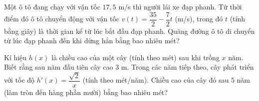 \begin{bt}%
	Một ô tô đang chạy với vận tốc $17{,}5$ m/s thì người lái xe đạp phanh. Từ thời điểm đó ô tô chuyển động với vận tốc $v(t)=\dfrac{35}{2}-\dfrac{7}{2} t$ (m/s), trong đó $t$ (tính bằng giây) là thời gian kể từ lúc bắt đầu đạp phanh. Quãng đường ô tô  di chuyển từ lúc đạp phanh đến khi dừng hẳn bằng bao nhiêu mét?
\end{bt}

\begin{bt}%
	Kí hiệu $h(x)$ là chiều cao của một cây (tính theo mét) sau khi trồng $x$ năm. Biết rằng sau năm đầu tiên cây cao $3$ m. Trong các năm tiếp theo, cây phát triển với tốc độ $h'(x)=\dfrac{\sqrt{2}}{x}$ (tính theo mét/năm). Chiều cao của cây đó sau $5$  năm (làm tròn đến hàng phần mười) bằng bao nhiêu mét?
\end{bt}

